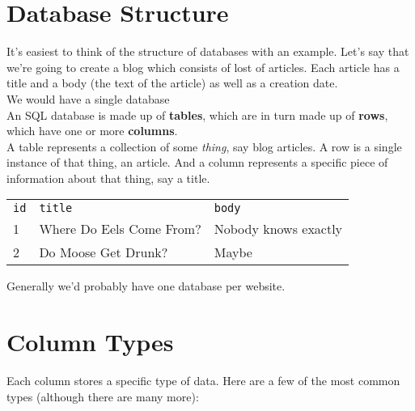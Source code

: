 \section{Database Structure}

It's easiest to think of the structure of databases with an example. Let's say that we're going to create a blog which consists of lost of articles. Each article has a title and a body (the text of the article) as well as a creation date.
\\

We would have a single database
\\

An SQL database is made up of \textbf{tables}, which are in turn made up of \textbf{rows}, which have one or more \textbf{columns}.
\\

A table represents a collection of some \textit{thing}, say blog articles. A row is a single instance of that thing, an article. And a column represents a specific piece of information about that thing, say a title.
\\

\begin{small}
    \begin{tabu}{l l X}
        \texttt{id} & \texttt{title}            & \texttt{body} \\
        1           & Where Do Eels Come From?  & Nobody knows exactly  \\
        2           & Do Moose Get Drunk?       & Maybe \\
    \end{tabu}
\end{small}
\par\bigskip

Generally we'd probably have one database per website.


\section{Column Types}

Each column stores a specific type of data. Here are a few of the most common types (although there are many more):
\\

